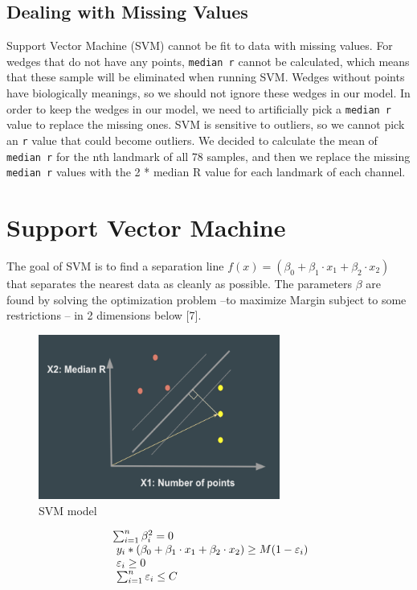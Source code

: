 \documentclass[10pt,letterpaper]{article}
\begin{document}
\subsection{Dealing with Missing
Values}\label{dealing-with-missing-values}

Support Vector Machine (SVM) cannot be fit to data with missing values.
For wedges that do not have any points, \texttt{median\ r} cannot be
calculated, which means that these sample will be eliminated when
running SVM. Wedges without points have biologically meanings, so we
should not ignore these wedges in our model. In order to keep the wedges
in our model, we need to artificially pick a \texttt{median\ r} value to
replace the missing ones. SVM is sensitive to outliers, so we cannot
pick an \texttt{r} value that could become outliers. We decided to
calculate the mean of \texttt{median\ r} for the nth landmark of all 78
samples, and then we replace the missing \texttt{median\ r} values with
the 2 * median R value for each landmark of each channel.

\section{Support Vector Machine}\label{support-vector-machine-1}

The goal of SVM is to find a separation line
\(f(x) = (\beta_0 + \beta_1 \cdot x_1 + \beta_2 \cdot x_2)\) that
separates the nearest data as cleanly as possible. The parameters
\(\beta\) are found by solving the optimization problem --to maximize
Margin subject to some restrictions -- in 2 dimensions below {[}7{]}.

\begin{figure}[h]
\includegraphics[width=3.12in]{figures/svm_fig} \caption{SVM model}\label{fig:svmfig}
\end{figure}

\begin{equation}
  \left.
  \begin{array}{l@{\,}l}
     \sum_{i=1}^n \beta_i^2 = 0 \\
     \ y_i * ( \beta_0 + \beta_1 \cdot x_1 + \beta_2 \cdot x_2 ) \geq M(1-\varepsilon_i) \\
     \ \varepsilon_i \geq 0 \\
     \ \sum_{i=1}^n \varepsilon_i \leq C \\
  \end{array}
  \right.
\end{equation}
\end{document}
